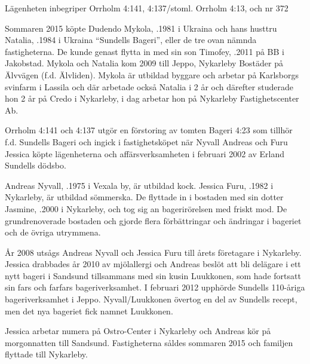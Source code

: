 Lägenheten inbegriper Orrholm 4:141, 4:137/stoml. Orrholm 4:13, och nr 372



Sommaren 2015 köpte Dudendo Mykola, .1981 i Ukraina och hans husttru Natalia, .1984 i Ukraina ``Sundells Bageri'', eller de tre ovan nämnda fastigheterna. De kunde genast flytta in med sin son Timofey, .2011 på BB i Jakobstad. Mykola och Natalia kom 2009 till Jeppo, Nykarleby Bostäder på Älvvägen (f.d. Älvliden). Mykola är utbildad byggare och arbetar på Karlsborgs svinfarm i Lassila och där arbetade också Natalia i 2 år och därefter studerade hon 2 år på Credo i Nykarleby, i dag arbetar hon på Nykarleby Fastighetscenter Ab.


Orrholm  4:141 och 4:137 utgör en förstoring av tomten Bageri 4:23 som tillhör f.d. Sundells Bageri och ingick i fastighetsköpet när Nyvall Andreas och Furu Jessica köpte lägenheterna och affärsverksamheten i februari 2002 av Erland Sundells dödsbo.

Andreas Nyvall, .1975 i Vexala by, är utbildad kock. Jessica Furu, .1982 i Nykarleby, är utbildad sömmerska. De flyttade in i bostaden med sin dotter Jasmine, .2000 i Nykarleby, och tog sig an bagerirörelsen med friskt mod. De grundrenoverade bostaden och gjorde flera förbättringar och ändringar i bageriet och de övriga utrymmena.


År 2008 utsågs Andreas Nyvall och Jessica Furu till årets företagare i Nykarleby. Jessica drabbades år 2010 av mjölallergi och Andreas beslöt att bli delägare i ett nytt bageri i Sandsund tillsammans med sin kusin Luukkonen, som hade fortsatt sin fars och farfars bageriverksamhet. I februari 2012 upphörde Sundells 110-åriga bageriverksamhet i Jeppo. Nyvall/Luukkonen övertog en del av Sundells recept, men det nya bageriet fick namnet Luukkonen.
\begin{jhchildren}
  \item {}
  \item {}
  \item {}
\end{jhchildren}
Jessica arbetar numera på Ostro-Center i Nykarleby och Andreas kör på morgonnatten till Sandsund. Fastigheterna såldes sommaren 2015 och familjen flyttade till Nykarleby.


